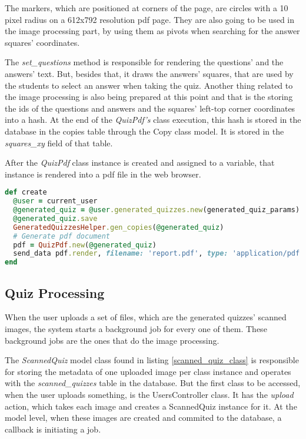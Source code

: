 The markers, which are positioned at corners of the page, are circles with a 10 pixel radius on a 612x792 resolution pdf page. They are also going to be used in the image processing part, by using them as pivots when searching for the answer squares' coordinates.

The \textit{set\_questions} method is responsible for rendering the questions' and the answers' text. But, besides that, it draws the answers' squares, that are used by the students to select an answer when taking the quiz. Another thing related to the image processing is also being prepared at this point and that is the storing the ids of the questions and answers and the squares' left-top corner coordinates into a hash. At the end of the \textit{QuizPdf's} class execution, this hash is stored in the database in the copies table through the Copy class model. It is stored in the \textit{squares\_xy} field of that table.

After the \textit{QuizPdf} class instance is created and assigned to a variable, that instance is rendered into a pdf file in the web browser. 

\begin{lstlisting}[language=Ruby, caption={Create method of the GeneratedQuizzesController class}, label=create_method]
def create
  @user = current_user
  @generated_quiz = @user.generated_quizzes.new(generated_quiz_params)
  @generated_quiz.save
  GeneratedQuizzesHelper.gen_copies(@generated_quiz)
  # Generate pdf document
  pdf = QuizPdf.new(@generated_quiz)
  send_data pdf.render, filename: 'report.pdf', type: 'application/pdf', disposition: 'inline'
end
\end{lstlisting}





\subsection{Quiz Processing}

When the user uploads a set of files, which are the generated quizzes' scanned images, the system starts a background job for every one of them. These background jobs are the ones that do the image processing. 

The \textit{ScannedQuiz} model class found in listing \ref{scanned_quiz_class} is responsible for storing the metadata of one uploaded image per class instance and operates with the \textit{scanned\_quizzes} table in the database. But the first class to be accessed, when the user uploads something, is the UsersController class. It has the \textit{upload} action, which takes each image and creates a ScannedQuiz instance for it. At the model level, when these images are created and commited to the database, a callback is initiating a job. 

